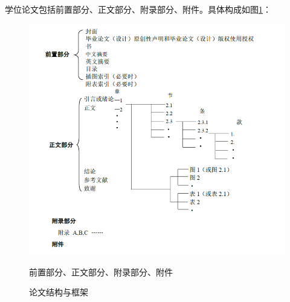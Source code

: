 学位论文包括前置部分、正文部分、附录部分、附件。具体构成如图\ref{fig:struct}：
\begin{figure}
\centering
\includegraphics[width=0.9\linewidth]{docs/imgs/structure}

\vspace{-8pt}
\notes 前置部分、正文部分、附录部分、附件
\vspace{-8pt}
\caption{论文结构与框架}\label{fig:struct}
\end{figure}
